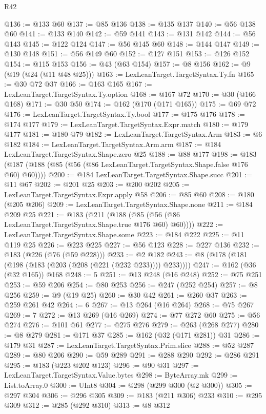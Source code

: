 \begin{lexlean}{R42}
\begin{coremodule}
{{{{{{{{{{{{{{{{{@136 := @133 @60
@137 := @85 @136
@138 := @135 @137
@140 := @56 @138 @60
@141 := @133 @140
@142 := @59 @141
@143 := @131 @142
@144 := @56 @143
@145 := @122 @124
@147 := @56 @145 @60
@148 := @144 @147
@149 := @130 @148
@151 := @56 @149 @60
@152 := @127 @151
@153 := @126 @152
@154 := @115 @153
@156 := @43 (@63 @154)
@157 := @8 @156
@162 := @9 (@19 (@24 (@11 @48 @25)))
@163 := LexLeanTarget.TargetSyntax.Ty.fn
@165 := @30 @72 @37
@166 := @163 @165
@167 := LexLeanTarget.TargetSyntax.Ty.option
@168 := @167 @72
@170 := @30 (@166 @168)
@171 := @30 @50
@174 := @162 (@170 (@171 @165))
@175 := @69 @72
@176 := LexLeanTarget.TargetSyntax.Ty.bool
@177 := @175 @176
@178 := @174 @177
@179 := LexLeanTarget.TargetSyntax.Expr.match
@180 := @179 @177
@181 := @180 @79
@182 := LexLeanTarget.TargetSyntax.Arm
@183 := @6 @182
@184 := LexLeanTarget.TargetSyntax.Arm.arm
@187 := @184 LexLeanTarget.TargetSyntax.Shape.zero @25
@188 := @88 @177
@198 := @183 (@187 (@188 (@85 (@56 (@86 LexLeanTarget.TargetSyntax.Shape.false @176 @60) @60))))
@200 := @184 LexLeanTarget.TargetSyntax.Shape.succ
@201 := @11 @67
@202 := @201 @25
@203 := @200 @202
@205 := LexLeanTarget.TargetSyntax.Expr.apply @58
@206 := @85 @60
@208 := @180 (@205 @206)
@209 := LexLeanTarget.TargetSyntax.Shape.none
@211 := @184 @209 @25
@221 := @183 (@211 (@188 (@85 (@56 (@86 LexLeanTarget.TargetSyntax.Shape.true @176 @60) @60))))
@222 := LexLeanTarget.TargetSyntax.Shape.some
@223 := @184 @222
@225 := @11 @119 @25
@226 := @223 @225
@227 := @56 @123
@228 := @227 @136
@232 := @183 (@226 (@76 (@59 @228)))
@233 := @2 @182
@243 := @8 (@178 (@181 (@198 (@183 (@203 (@208 (@221 (@232 @233)))) @233))))
@247 := @162 (@36 (@32 @165)) @168
@248 := 5
@251 := @13 @248 (@16 @248)
@252 := @75 @251
@253 := @59 @206
@254 := @80 @253
@256 := @247 (@252 @254)
@257 := @8 @256
@259 := @9 (@19 @25)
@260 := @30 @42
@261 := @260 @37
@263 := @259 @261 @42
@264 := 6
@267 := @13 @264 (@16 @264)
@268 := @75 @267
@269 := 7
@272 := @13 @269 (@16 @269)
@274 := @77 @272 @60
@275 := @56 @274
@276 := @101 @61
@277 := @275 @276
@279 := @263 (@268 @277)
@280 := @8 @279
@281 := @171 @37
@285 := @162 (@32 (@171 @281)) @31
@286 := @179 @31
@287 := LexLeanTarget.TargetSyntax.Prim.slice
@288 := @52 @287
@289 := @80 @206
@290 := @59 @289
@291 := @288 @290
@292 := @286 @291
@295 := @183 (@223 @202 @123)
@296 := @90 @31
@297 := LexLeanTarget.TargetSyntax.Value.bytes
@298 := ByteArray.mk
@299 := List.toArray.{0}
@300 := UInt8
@304 := @298 (@299 @300 (@2 @300))
@305 := @297 @304
@306 := @296 @305
@309 := @183 (@211 @306) @233
@310 := @295 @309
@312 := @285 (@292 @310)
@313 := @8 @312
}}}}}}}}}}}}}}}}}
\end{coremodule}
\end{lexlean}
